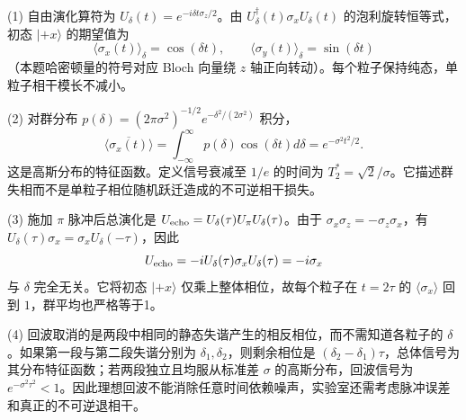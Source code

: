 (1) 自由演化算符为 \(U_\delta(t)=e^{-i\delta t\sigma_z/2}\)。由 \(U^\dagger_\delta(t)\sigma_xU_\delta(t)\) 的泡利旋转恒等式，初态 \(|+x\rangle\) 的期望值为
\[
\langle\sigma_x(t)\rangle_\delta=\cos(\delta t),
\qquad \langle\sigma_y(t)\rangle_\delta=\sin(\delta t)
\]
（本题哈密顿量的符号对应 Bloch 向量绕 \(z\) 轴正向转动）。每个粒子保持纯态，单粒子相干模长不减小。

(2) 对群分布 \(p(\delta)=(2\pi\sigma^2)^{-1/2}e^{-\delta^2/(2\sigma^2)}\) 积分，
\[
\overline{\langle\sigma_x(t)\rangle}=\int_{-\infty}^\infty p(\delta)\cos(\delta t)d\delta
=e^{-\sigma^2t^2/2}.
\]
这是高斯分布的特征函数。定义信号衰减至 \(1/e\) 的时间为 \(T_2^*=\sqrt2/\sigma\)。它描述群失相而不是单粒子相位随机跃迁造成的不可逆相干损失。

(3) 施加 \(\pi\) 脉冲后总演化是 \(U_{\rm echo}=U_\delta(\tau)U_\pi U_\delta(\tau)\)。由于 \(\sigma_x\sigma_z=-\sigma_z\sigma_x\)，有 \(U_\delta(\tau)\sigma_x=\sigma_x U_\delta(-\tau)\)，因此
\[
U_{\rm echo}=-iU_\delta(\tau)\sigma_xU_\delta(\tau)=-i\sigma_x
\]
与 \(\delta\) 完全无关。它将初态 \(|+x\rangle\) 仅乘上整体相位，故每个粒子在 \(t=2\tau\) 的 \(\langle\sigma_x\rangle\) 回到 \(1\)，群平均也严格等于1。

(4) 回波取消的是两段中相同的静态失谐产生的相反相位，而不需知道各粒子的 \(\delta\)。如果第一段与第二段失谐分别为 \(\delta_1,\delta_2\)，则剩余相位是 \((\delta_2-\delta_1)\tau\)，总体信号为其分布特征函数；若两段独立且均服从标准差 \(\sigma\) 的高斯分布，回波信号为 \(e^{-\sigma^2\tau^2}<1\)。因此理想回波不能消除任意时间依赖噪声，实验室还需考虑脉冲误差和真正的不可逆退相干。
